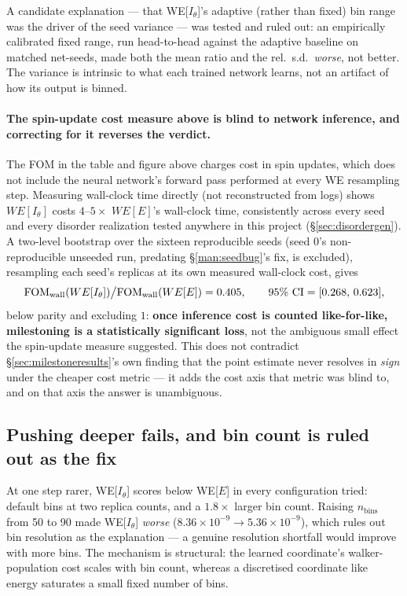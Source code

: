 \documentclass[11pt,a4paper]{article}
\begin{document}
A candidate explanation --- that WE[$I_\theta$]'s adaptive (rather than fixed) bin range was the
driver of the seed variance --- was tested and ruled out: an empirically calibrated fixed range,
run head-to-head against the adaptive baseline on matched net-seeds, made both the mean ratio and
the rel.\ s.d.\ \emph{worse}, not better. The variance is intrinsic to what each trained network
learns, not an artifact of how its output is binned.

\paragraph{The spin-update cost measure above is blind to network inference, and correcting for
it reverses the verdict.} The FOM in the table and figure above charges cost in spin updates,
which does not include the neural network's forward pass performed at every WE resampling step.
Measuring wall-clock time directly (not reconstructed from logs) shows $WE[I_\theta]$ costs
$4$--$5\times$ $WE[E]$'s wall-clock time, consistently across every seed and every disorder
realization tested anywhere in this project (\S\ref{sec:disordergen}). A two-level bootstrap over
the sixteen reproducible seeds (seed 0's non-reproducible unseeded run, predating
\S\ref{man:seedbug}'s fix, is excluded), resampling each seed's replicas at its own measured
wall-clock cost, gives
\begin{equation}
\mathrm{FOM}_{\rm wall}(WE[I_\theta])\big/\mathrm{FOM}_{\rm wall}(WE[E]) = 0.405,
\qquad 95\%\ \mathrm{CI}=[0.268,\,0.623],
\label{eq:milefomwall}
\end{equation}
below parity and excluding $1$: \textbf{once inference cost is counted like-for-like, milestoning
is a statistically significant loss}, not the ambiguous small effect the spin-update measure
suggested. This does not contradict \S\ref{sec:milestoneresults}'s own finding that the point
estimate never resolves in \emph{sign} under the cheaper cost metric --- it adds the cost axis
that metric was blind to, and on that axis the answer is unambiguous.

\subsection{Pushing deeper fails, and bin count is ruled out as the fix}
At one step rarer, WE[$I_\theta$] scores below WE[$E$] in every configuration tried: default bins
at two replica counts, and a $1.8\times$ larger bin count. Raising $n_{\text{bins}}$ from 50 to 90
made WE[$I_\theta$] \emph{worse} ($8.36\times10^{-9}\to5.36\times10^{-9}$), which rules out bin
resolution as the explanation --- a genuine resolution shortfall would improve with more bins.
The mechanism is structural: the learned coordinate's walker-population cost scales with bin
count, whereas a discretised coordinate like energy saturates a small fixed number of bins.
\end{document}
